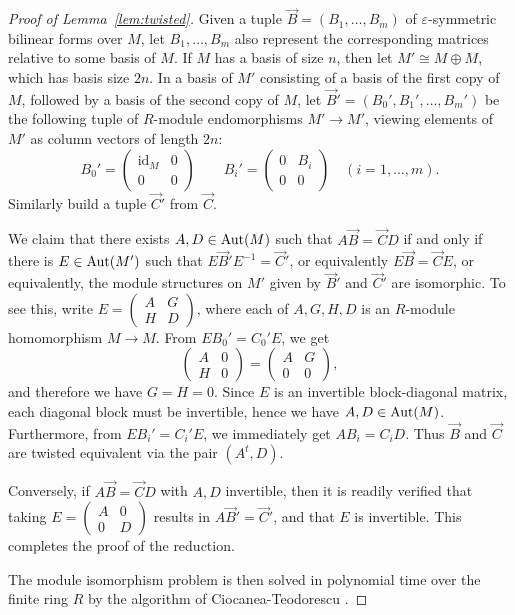 \begin{proof}[Proof of Lemma~\ref{lem:twisted}]
Given a tuple $\vec{B} = (B_1, \dotsc, B_m)$ of $\varepsilon$-symmetric bilinear forms over $M$, let $B_1, \dotsc, B_m$ also represent the corresponding matrices relative to some basis of $M$. If $M$ has a basis of size $n$, then let $M' \cong M \oplus M$, which has basis size $2n$. In a basis of $M'$ consisting of a basis of the first copy of $M$, followed by a basis of the second copy of $M$, let $\vec{B}' = (B_0', B_1', \dotsc, B_m')$ be the following tuple of $R$-module endomorphisms $M' \to M'$, viewing elements of $M'$ as column vectors of length $2n$:
\[
B_0' = \begin{pmatrix} \text{id}_M & 0 \\ 0 & 0 \end{pmatrix}
\qquad
B_i' = \begin{pmatrix} 0 & B_i \\ 0 & 0 \end{pmatrix} \quad (i=1,\dotsc,m).
\]
Similarly build a tuple $\vec{C}'$ from $\vec{C}$.

We claim that there exists $A,D \in \mathrm{Aut}(M)$ such that $A \vec{B} = \vec{C}D$ if and only if there is $E \in \mathrm{Aut}(M')$ such that $E \vec{B}' E^{-1} = \vec{C}'$, or equivalently $E \vec{B} = \vec{C} E$, or equivalently, the module structures on $M'$ given by $\vec{B}'$ and $\vec{C}'$ are isomorphic. To see this, write $E = \begin{pmatrix} A & G \\ H & D \end{pmatrix}$, where each of $A,G,H,D$ is an $R$-module homomorphism $M \to M$. From $E B_0' = C_0' E$, we get 
\[
\begin{pmatrix} A & 0 \\ H & 0 \end{pmatrix} = \begin{pmatrix} A & G \\ 0 & 0 \end{pmatrix},
\]
and therefore we have $G = H = 0$. Since $E$ is an invertible block-diagonal matrix, each diagonal block must be invertible, hence we have $A,D \in \mathrm{Aut}(M)$. Furthermore, from $E B_i' = C_i' E$, we immediately get $A B_i = C_i D$. Thus $\vec{B}$ and $\vec{C}$ are twisted equivalent via the pair $(A^t, D)$. 

Conversely, if $A \vec{B} = \vec{C} D$ with $A,D$ invertible, then it is readily verified that taking $E = \begin{pmatrix} A & 0 \\ 0 & D \end{pmatrix}$ results in $A \vec{B}' = \vec{C}'$, and that $E$ is invertible. This completes the proof of the reduction.

The module isomorphism problem is then solved in polynomial time over the finite ring $R$ by the algorithm of Ciocanea-Teodorescu \cite{CT}.
\end{proof}